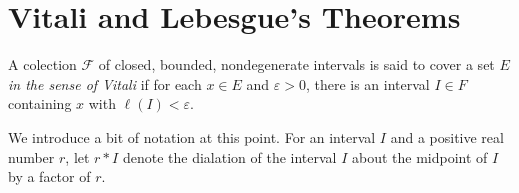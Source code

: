 \section{Vitali and Lebesgue's Theorems}

\begin{definition}
    A colection $\mathcal F$ of closed, bounded, nondegenerate intervals is said to cover a set $E$ \emph{in the sense of Vitali} if for each $x\in E$ and $\varepsilon > 0$, there is an interval $I\in F$ containing $x$ with $\ell(I) < \varepsilon$.
\end{definition}

We introduce a bit of notation at this point. For an interval $I$ and a positive real number $r$, let $r * I$ denote the dialation of the interval $I$ about the midpoint of $I$ by a factor of $r$.

